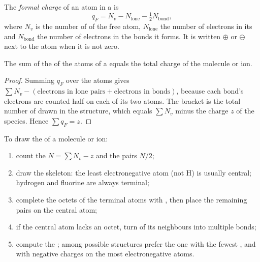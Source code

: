 \begin{definition}\label{def:b1:lewis-resonance-vsepr:formal-charge}
The \emph{formal charge} of an atom in a  is
\[
  q_F = N_v - N_{\text{lone}} - \tfrac12 N_{\text{bond}},
\]
where $N_v$ is the number of  of the free atom,
$N_{\text{lone}}$ the number of electrons in its  and
$N_{\text{bond}}$ the number of electrons in the bonds it forms. It is
written $\oplus$ or $\ominus$ next to the atom when it is not zero.
\end{definition}

\begin{proposition}\label{prop:b1:lewis-resonance-vsepr:formal-sum}
The sum of the  of the atoms of a  equals
the total charge of the molecule or ion.
\end{proposition}

\begin{proof}
Summing $q_F$ over the atoms gives $\sum N_v - (\text{electrons in lone
pairs} + \text{electrons in bonds})$, because each bond's electrons are
counted half on each of its two atoms. The bracket is the total number
of  drawn in the structure, which equals $\sum N_v$ minus
the charge $z$ of the species. Hence $\sum q_F = z$.
\end{proof}

\begin{method}\label{met:b1:lewis-resonance-vsepr:lewis}
To draw the  of a molecule or ion:
\begin{enumerate}
  \item count the  $N = \sum N_v - z$ and the pairs $N/2$;
  \item draw the skeleton: the least electronegative atom (not H) is
        usually central; hydrogen and fluorine are always terminal;
  \item complete the octets of the terminal atoms with , then
        place the remaining pairs on the central atom;
  \item if the central atom lacks an octet, turn  of its
        neighbours into multiple bonds;
  \item compute the ; among possible structures prefer the
        one with the fewest , and with negative charges on
        the most electronegative atoms.
\end{enumerate}
\end{method}

